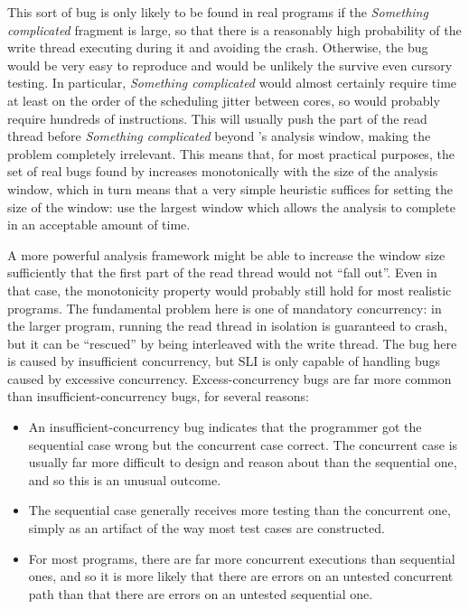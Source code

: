 This sort of bug is only likely to be found in real programs if the
\textit{Something complicated} fragment is large, so that there is a
reasonably high probability of the write thread executing during it
and avoiding the crash.  Otherwise, the bug would be very easy to
reproduce and would be unlikely the survive even cursory testing.  In
particular, \textit{Something complicated} would almost certainly
require time at least on the order of the scheduling jitter between
cores, so would probably require hundreds of instructions.  This will
usually push the part of the read thread before \textit{Something
  complicated} beyond {\technique}'s analysis window, making the
problem completely irrelevant.  This means
that, for most practical purposes, the set of real bugs found by
increases monotonically with the size of the analysis window, which in
turn means that a very simple heuristic suffices for setting the size
of the window: use the largest window which allows the analysis to
complete in an acceptable amount of time.


A more powerful analysis framework might be able to increase the
window size sufficiently that the first part of the read thread would
not ``fall out''.  Even in that case, the monotonicity property would
probably still hold for most realistic programs.  The fundamental
problem here is one of mandatory concurrency: in the larger program,
running the read thread in isolation is guaranteed to crash, but it
can be ``rescued'' by being interleaved with the write thread.  The
bug here is caused by insufficient concurrency, but SLI is only
capable of handling bugs caused by excessive concurrency.
Excess-concurrency bugs are far more common than
insufficient-concurrency bugs, for several reasons:

\begin{itemize}
\item
  An insufficient-concurrency bug indicates that the programmer got
  the sequential case wrong but the concurrent case correct.  The
  concurrent case is usually far more difficult to design and reason
  about than the sequential one, and so this is an unusual
  outcome\needCite{}.
\item
  The sequential case generally receives more testing than the
  concurrent one, simply as an artifact of the way most test cases are
  constructed\needCite{}.
\item
  For most programs, there are far more concurrent executions than
  sequential ones, and so it is more likely that there are errors on
  an untested concurrent path than that there are errors on an
  untested sequential one.
\end{itemize}


